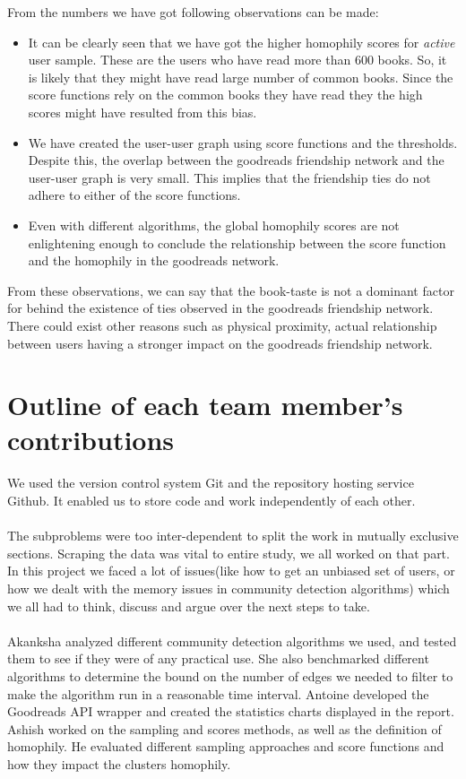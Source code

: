 \documentclass[11pt]{article}
\begin{document}
From the numbers we have got following observations can be made:
\begin{itemize}
	\item It can be clearly seen that we have got the higher homophily scores for {\it active} user sample. These are the users who have read more than $600$ books. So, it is likely that they might have read large number of common books. Since the score functions rely on the common books they have read they the high scores might have resulted from this bias.
    \item We have created the user-user graph using score functions and the thresholds. Despite this, the overlap between the goodreads friendship network and the user-user graph is very small. This implies that the friendship ties do not adhere to either of the score functions.
    \item Even with different algorithms, the global homophily scores are not enlightening enough to conclude the relationship between the score function and the homophily in the goodreads network.
\end{itemize}
From these observations, we can say that the book-taste is not a dominant factor for behind the existence of ties observed in the goodreads friendship network. There could exist other reasons such as physical proximity, actual relationship between users having a stronger impact on the goodreads friendship network.

\section{Outline of each team member's contributions}

We used the version control system Git and the repository hosting service Github. It enabled us to store code and work independently of each other.\\\\
The subproblems were too inter-dependent to split the work in mutually exclusive sections. Scraping the data was vital to entire study, we all worked on that part. In this project we faced a lot of issues(like how to get an unbiased set of users, or how we dealt with the memory issues in community detection algorithms) which we all had to think, discuss and argue over the next steps to take.\\\\
Akanksha analyzed different community detection algorithms we used, and tested them to see if they were of any practical use. She also benchmarked different algorithms to determine the bound on the number of edges we needed to filter to make the algorithm run in a reasonable time interval. Antoine developed the Goodreads API wrapper and created the statistics charts displayed in the report.
Ashish worked on the sampling and scores methods, as well as the definition of homophily. He evaluated different sampling approaches and score functions and how they impact the clusters homophily.




\end{document}
